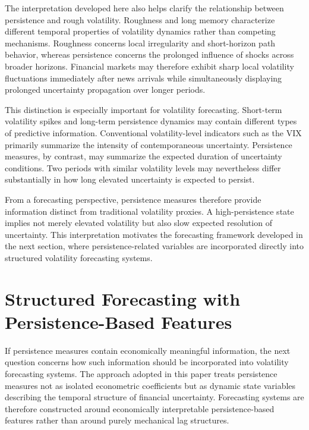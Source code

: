 \documentclass[unnumsec,webpdf,contemporary,large]{oup-authoring-template}%
\theoremstyle{thmstyleone}%
\theoremstyle{thmstyletwo}%
\theoremstyle{thmstylethree}%
\begin{document}
The interpretation developed here also helps clarify the relationship
between persistence and rough volatility. Roughness and long memory
characterize different temporal properties of volatility dynamics rather
than competing mechanisms. Roughness concerns local irregularity and
short-horizon path behavior, whereas persistence concerns the prolonged
influence of shocks across broader horizons. Financial markets may
therefore exhibit sharp local volatility fluctuations immediately after
news arrivals while simultaneously displaying prolonged uncertainty
propagation over longer periods.

This distinction is especially important for volatility forecasting.
Short-term volatility spikes and long-term persistence dynamics may contain
different types of predictive information. Conventional volatility-level
indicators such as the VIX primarily summarize the intensity of
contemporaneous uncertainty. Persistence measures, by contrast, may
summarize the expected duration of uncertainty conditions. Two periods with
similar volatility levels may nevertheless differ substantially in how long
elevated uncertainty is expected to persist.

From a forecasting perspective, persistence measures therefore provide
information distinct from traditional volatility proxies. A
high-persistence state implies not merely elevated volatility but also slow
expected resolution of uncertainty. This interpretation motivates the
forecasting framework developed in the next section, where
persistence-related variables are incorporated directly into structured
volatility forecasting systems.

\section{Structured Forecasting with Persistence-Based Features}
\label{sec:ml}

If persistence measures contain economically meaningful information, the
next question concerns how such information should be incorporated into
volatility forecasting systems. The approach adopted in this paper treats
persistence measures not as isolated econometric coefficients but as dynamic
state variables describing the temporal structure of financial uncertainty.
Forecasting systems are therefore constructed around economically
interpretable persistence-based features rather than around purely
mechanical lag structures.
\end{document}
